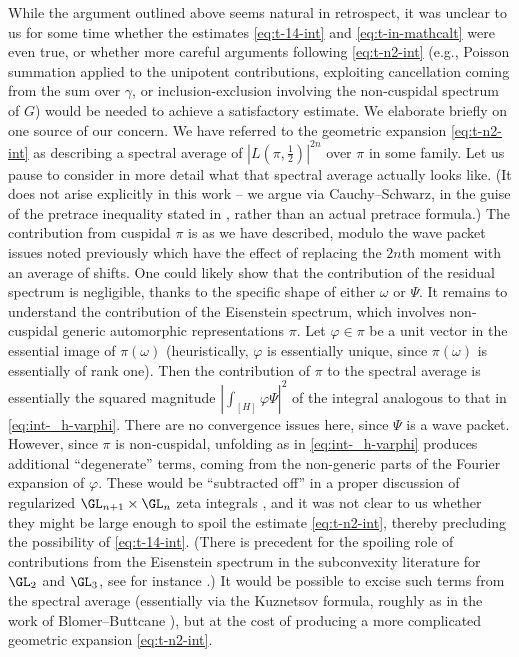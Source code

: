 \begin{remark}
  While the argument outlined above seems natural in retrospect, it was unclear to us for some time whether the estimates \eqref{eq:t-14-int} and \eqref{eq:t-in-mathcalt} were even true, or whether more careful arguments following \eqref{eq:t-n2-int} (e.g., Poisson summation applied to the unipotent contributions, exploiting cancellation coming from the sum over $\gamma$, or inclusion-exclusion involving the non-cuspidal spectrum of $G$) would be needed to achieve a satisfactory estimate.  We elaborate briefly on one source of our concern.  We have referred to the geometric expansion \eqref{eq:t-n2-int} as describing a spectral average of $\left\lvert L(\pi,\tfrac{1}{2}) \right\rvert^{2 n}$ over $\pi$ in some family.  Let us pause to consider in more detail what that spectral average actually looks like.  (It does not arise explicitly in this work -- we argue via Cauchy--Schwarz, in the guise of the pretrace inequality stated in \cite[Lemma 5.5]{2020arXiv201202187N}, rather than an actual pretrace formula.)  The contribution from cuspidal $\pi$ is as we have described, modulo the wave packet issues noted previously which have the effect of replacing the $2n$th moment with an average of shifts.  One could likely show that the contribution of the residual spectrum is negligible, thanks to the specific shape of either $\omega$ or $\Psi$.  It remains to understand the contribution of the Eisenstein spectrum, which involves non-cuspidal generic automorphic representations $\pi$.  Let $\varphi \in \pi$ be a unit vector in the essential image of $\pi(\omega)$ (heuristically, $\varphi$ is essentially unique, since $\pi(\omega)$ is essentially of rank one).  Then the contribution of $\pi$ to the spectral average is essentially the squared magnitude $\left\lvert \int_{[H]} \varphi \Psi \right\rvert^2$ of the integral analogous to that in \eqref{eq:int-_h-varphi}.  There are no convergence issues here, since $\Psi$ is a wave packet.  However, since $\pi$ is non-cuspidal, unfolding as in \eqref{eq:int-_h-varphi} produces additional ``degenerate'' terms, coming from the non-generic parts of the Fourier expansion of $\varphi$.  These would be ``subtracted off'' in a proper discussion of regularized $\GL_{n+1} \times \GL_{n}$ zeta integrals \cite{MR3334892}, and it was not clear to us whether they might be large enough to spoil the estimate \eqref{eq:t-n2-int}, thereby precluding the possibility of \eqref{eq:t-14-int}.  (There is precedent for the spoiling role of contributions from the Eisenstein spectrum in the subconvexity literature for $\GL_2$ and $\GL_3$, see for instance \cite{MR1923476, MR3694659}.)  It would be possible to excise such terms from the spectral average (essentially via the Kuznetsov formula, roughly as in the work of Blomer--Buttcane \cite{MR4203038, MR4039487}), but at the cost of producing a more complicated geometric expansion \eqref{eq:t-n2-int}.
\end{remark}



